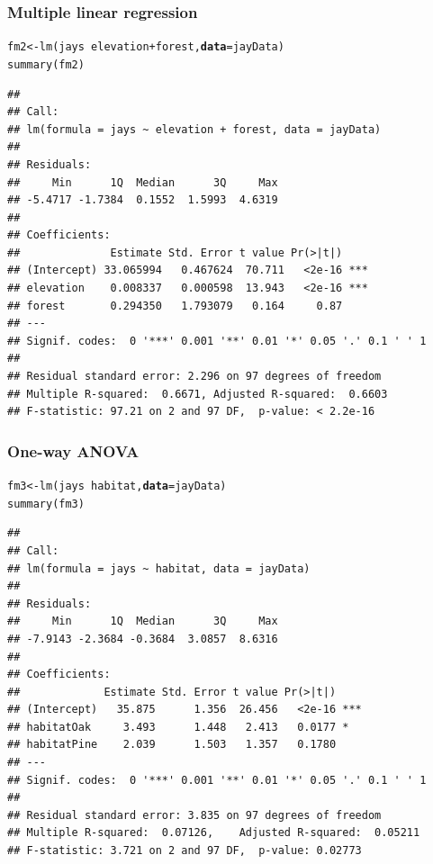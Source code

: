 \documentclass[color=usenames,dvipsnames]{beamer}\usepackage[]{graphicx}\usepackage[]{color}
\makeatletter
\newcommand{\hlopt}[1]{\textcolor[rgb]{0,0,0}{#1}}%
\newcommand{\hlstd}[1]{\textcolor[rgb]{0,0,0}{#1}}%
\newcommand{\hlkwb}[1]{\textcolor[rgb]{0,0.341,0.682}{#1}}%
\newcommand{\hlkwc}[1]{\textcolor[rgb]{0,0,0}{\textbf{#1}}}%
\newcommand{\hlkwd}[1]{\textcolor[rgb]{0.004,0.004,0.506}{#1}}%
\newenvironment{kframe}{%
 \def\at@end@of@kframe{}%
 \ifinner\ifhmode%
  \def\at@end@of@kframe{\end{minipage}}%
  \begin{minipage}{\columnwidth}%
 \fi\fi%
 \def\FrameCommand##1{\hskip\@totalleftmargin \hskip-\fboxsep
 \colorbox{shadecolor}{##1}\hskip-\fboxsep
     \hskip-\linewidth \hskip-\@totalleftmargin \hskip\columnwidth}%
 \MakeFramed {\advance\hsize-\width
   \@totalleftmargin\z@ \linewidth\hsize
   \@setminipage}}%
 {\par\unskip\endMakeFramed%
 \at@end@of@kframe}
\newenvironment{knitrout}{}{} %
\makeatother
\begin{document}
\begin{frame}[fragile]
  \frametitle{Multiple linear regression}
\begin{knitrout}\scriptsize
{}\color{fgcolor}\begin{kframe}
\begin{alltt}
\hlstd{fm2} \hlkwb{<-} \hlkwd{lm}\hlstd{(jays} \hlopt{~} \hlstd{elevation}\hlopt{+}\hlstd{forest,} \hlkwc{data}\hlstd{=jayData)}
\hlkwd{summary}\hlstd{(fm2)}
\end{alltt}
\begin{verbatim}
## 
## Call:
## lm(formula = jays ~ elevation + forest, data = jayData)
## 
## Residuals:
##     Min      1Q  Median      3Q     Max 
## -5.4717 -1.7384  0.1552  1.5993  4.6319 
## 
## Coefficients:
##              Estimate Std. Error t value Pr(>|t|)    
## (Intercept) 33.065994   0.467624  70.711   <2e-16 ***
## elevation    0.008337   0.000598  13.943   <2e-16 ***
## forest       0.294350   1.793079   0.164     0.87    
## ---
## Signif. codes:  0 '***' 0.001 '**' 0.01 '*' 0.05 '.' 0.1 ' ' 1
## 
## Residual standard error: 2.296 on 97 degrees of freedom
## Multiple R-squared:  0.6671,	Adjusted R-squared:  0.6603 
## F-statistic: 97.21 on 2 and 97 DF,  p-value: < 2.2e-16
\end{verbatim}
\end{kframe}
\end{knitrout}
\end{frame}




\begin{frame}[fragile]
  \frametitle{One-way ANOVA}
\begin{knitrout}\scriptsize
{}\color{fgcolor}\begin{kframe}
\begin{alltt}
\hlstd{fm3} \hlkwb{<-} \hlkwd{lm}\hlstd{(jays} \hlopt{~} \hlstd{habitat,} \hlkwc{data}\hlstd{=jayData)}
\hlkwd{summary}\hlstd{(fm3)}
\end{alltt}
\begin{verbatim}
## 
## Call:
## lm(formula = jays ~ habitat, data = jayData)
## 
## Residuals:
##     Min      1Q  Median      3Q     Max 
## -7.9143 -2.3684 -0.3684  3.0857  8.6316 
## 
## Coefficients:
##             Estimate Std. Error t value Pr(>|t|)    
## (Intercept)   35.875      1.356  26.456   <2e-16 ***
## habitatOak     3.493      1.448   2.413   0.0177 *  
## habitatPine    2.039      1.503   1.357   0.1780    
## ---
## Signif. codes:  0 '***' 0.001 '**' 0.01 '*' 0.05 '.' 0.1 ' ' 1
## 
## Residual standard error: 3.835 on 97 degrees of freedom
## Multiple R-squared:  0.07126,	Adjusted R-squared:  0.05211 
## F-statistic: 3.721 on 2 and 97 DF,  p-value: 0.02773
\end{verbatim}
\end{kframe}
\end{knitrout}
\end{frame}
\end{document}
